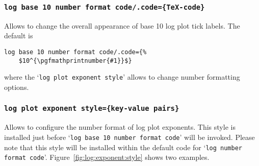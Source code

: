 \subsubsection[\texttt{log base 10 number format code/.code=\{\}}]{\texttt{log base 10 number format code/.code=\{\TeX-code\}}}
Allows to change the overall appearance of base 10 log plot tick labels. The default is
\begin{lstlisting}
log base 10 number format code/.code={%
	$10^{\pgfmathprintnumber{#1}}$}
\end{lstlisting}
where the `\texttt{log plot exponent style}' allows to change number formatting options.

\subsubsection{\texttt{log plot exponent style=\{key-value pairs\}}}
Allows to configure the number format of log plot exponents. This style is installed just before `\texttt{log base 10 number format code}' will be invoked. Please note that this style will be installed within the default code for `\texttt{log number format code}'. Figure~\ref{fig:log:exponent:style} shows two examples.
